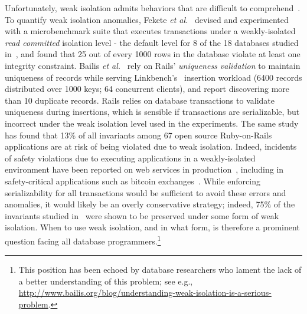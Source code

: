 Unfortunately, weak isolation admits behaviors that are difficult to
comprehend~\cite{berenson}. To quantify weak isolation anomalies,
Fekete \emph{et al.}~\cite{feketevldb09} devised and experimented with
a microbenchmark suite that executes transactions under a
weakly-isolated \emph{read committed} isolation level - the default
level for 8 of the 18 databases studied in~\cite{bailishotos}, and
found that 25 out of every 1000 rows in the database violate at least
one integrity constraint. Bailis \emph{et al.}~\cite{bailisferal} rely
on Rails' \emph{uniqueness validation} to maintain uniqueness of
records while serving Linkbench's~\cite{linkbench} insertion workload
(6400 records distributed over 1000 keys; 64 concurrent clients), and
report discovering more than 10 duplicate records.  Rails relies on
database transactions to validate uniqueness during insertions, which
is sensible if transactions are serializable, but incorrect under the
weak isolation level used in the experiments. The same study has found
that 13\% of all invariants among 67 open source Ruby-on-Rails
applications are at risk of being violated due to weak
isolation. Indeed, incidents of safety violations due to executing
applications in a weakly-isolated environment have been reported on
web services in production~\cite{starbucksbug, scimedbug}, including
in safety-critical applications such as bitcoin
exchanges~\cite{poloniexbug, bitcoinbug}. While enforcing
serializability for all transactions would be sufficient to avoid
these errors and anomalies, it would likely be an overly conservative
strategy; indeed, 75\% of the invariants studied in~\cite{bailisferal}
were shown to be preserved under some form of weak isolation.  When to
use weak isolation, and in what form, is therefore a prominent
question facing all database programmers.\footnote{This position has
been echoed by database researchers who lament the lack of a
better understanding of this problem; see e.g., \url{
  http://www.bailis.org/blog/understanding-weak-isolation-is-a-serious-problem}.}


